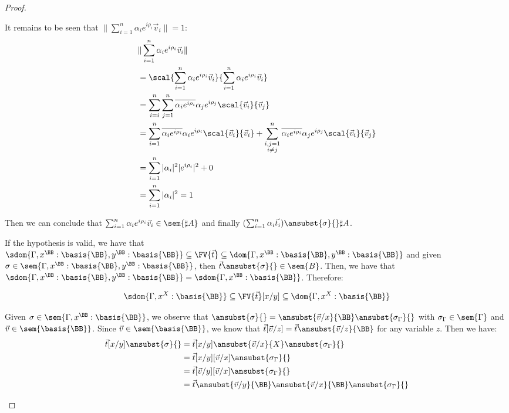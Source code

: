 \begin{proof}
\begin{description}
    It remains to be seen that $\|\sum_{i=1}^{n} \alpha_i e^{i\rho_i} \vec{v}_{i}\|=1$:
    \begin{align*}
    &\|\sum_{i=1}^{n} \alpha_i e^{i\rho_i} \vec{v}_{i}\| \\
    &=\scal{\sum_{i=1}^{n} \alpha_i e^{i\rho_i}\vec{v}_{i}}{\sum_{i=1}^{n} \alpha_i e^{i\rho_i} \vec{v}_{i}}\\
    &= \sum_{i=i}^{n}\sum_{j=1}^{n} \overline{\alpha_i e^{i\rho_i}}\alpha_j e^{i\rho_j} \scal{\vec{v}_{i}}{\vec{v}_{j}}\\
    &=\sum_{i=1}^{n} \overline{\alpha_i e^{i\rho_i}}\alpha_i e^{i\rho_i} \scal{\vec{v}_{i}}{\vec{v}_{i}} + \sum_{\substack{i,j=1\\i\neq j}}^{n} \overline{\alpha_i e^{i\rho_i}}\alpha_j e^{i\rho_j} \scal{\vec{v}_{i}}{\vec{v}_{j}}\\
    &=\sum_{i=1}^{n}|\alpha_i|^2 |e^{i\rho_i}|^2+ 0\\
    &=\sum_{i=1}^{n}|\alpha_i|^2 = 1\\
    \end{align*}

    Then we can conclude that $\sum_{i=1}^{n}\alpha_i e^{i\rho_i}\vec{v}_{i}\in\sem{\sharp A}$ and finally $(\sum_{i=1}^{n}\alpha_i\vec{t}_{i})\ansubst{\sigma}{}\real\sharp A$.

    \item[Contr] If the hypothesis is valid, we have that $\sdom{\Gamma, x^\BB:\basis{\BB}, y^\BB:\basis{\BB}}\subseteq\FV{\vec{t}}\subseteq\dom{\Gamma,x^\BB:\basis{\BB}, y^\BB:\basis{\BB}}$ and given $\sigma\in\sem{\Gamma, x^\BB:\basis{\BB}, y^\BB:\basis{\BB}}$, then $\vec{t}\ansubst{\sigma}{}\in\sem{B}$. Then, we have that $\sdom{\Gamma, x^\BB:\basis{\BB}, y^\BB:\basis{\BB}}=\sdom{\Gamma, x^\BB:\basis{\BB}}$. Therefore:
    
    \[
    \sdom{\Gamma, x^X:\basis{\BB}}\subseteq\FV{\vec{t}}[x/y]\subseteq\dom{\Gamma, x^X:\basis{\BB}}
    \]

    Given $\sigma\in\sem{\Gamma, x^\BB:\basis{\BB}}$, we observe that $\ansubst{\sigma}{}=\ansubst{\vec{v}/x}{\BB}\ansubst{\sigma_\Gamma}{}$ with $\sigma_\Gamma\in\sem{\Gamma}$ and $\vec{v}\in\sem{\basis{\BB}}$. Since $\vec{v}\in\sem{\basis{\BB}}$, we know that $\vec{t}[\vec v/z] =\vec{t}\ansubst{\vec{v}/z}{\BB}$ for any variable $z$. Then we have:
    \begin{align*}
        \vec{t}[x/y]\ansubst{\sigma}{} &= \vec{t}[x/y]\ansubst{\vec{v}/x}{X}\ansubst{\sigma_\Gamma}{}\\
        &=\vec{t}[x/y][\vec{v}/x]\ansubst{\sigma_\Gamma}{}\\
        &=\vec{t}[\vec{v}/y][\vec{v}/x]\ansubst{\sigma_\Gamma}{}\\
        &=\vec{t}\ansubst{\vec{v}/y}{\BB}\ansubst{\vec{v}/x}{\BB}\ansubst{\sigma_\Gamma}{}    
    \end{align*}
    

\end{description}
\end{proof}

